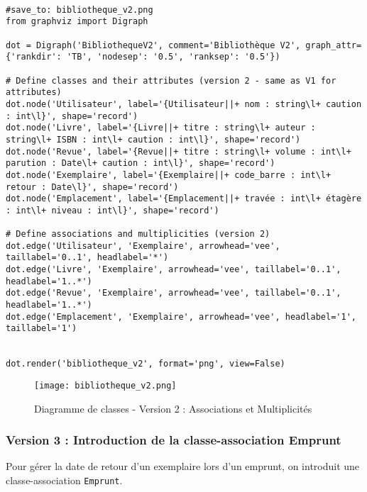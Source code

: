 \documentclass{article}
\begin{document}
\begin{verbatim}

#save_to: bibliotheque_v2.png
from graphviz import Digraph

dot = Digraph('BibliothequeV2', comment='Bibliothèque V2', graph_attr={'rankdir': 'TB', 'nodesep': '0.5', 'ranksep': '0.5'})

# Define classes and their attributes (version 2 - same as V1 for attributes)
dot.node('Utilisateur', label='{Utilisateur||+ nom : string\l+ caution : int\l}', shape='record')
dot.node('Livre', label='{Livre||+ titre : string\l+ auteur : string\l+ ISBN : int\l+ caution : int\l}', shape='record')
dot.node('Revue', label='{Revue||+ titre : string\l+ volume : int\l+ parution : Date\l+ caution : int\l}', shape='record')
dot.node('Exemplaire', label='{Exemplaire||+ code_barre : int\l+ retour : Date\l}', shape='record')
dot.node('Emplacement', label='{Emplacement||+ travée : int\l+ étagère : int\l+ niveau : int\l}', shape='record')

# Define associations and multiplicities (version 2)
dot.edge('Utilisateur', 'Exemplaire', arrowhead='vee', taillabel='0..1', headlabel='*')
dot.edge('Livre', 'Exemplaire', arrowhead='vee', taillabel='0..1', headlabel='1..*')
dot.edge('Revue', 'Exemplaire', arrowhead='vee', taillabel='0..1', headlabel='1..*')
dot.edge('Emplacement', 'Exemplaire', arrowhead='vee', headlabel='1', taillabel='1')


dot.render('bibliotheque_v2', format='png', view=False)
\end{verbatim}

\begin{figure}[H]
    \centering
    \texttt{[image: bibliotheque\_v2.png]}
    \caption{Diagramme de classes - Version 2 : Associations et Multiplicités}
    \label{fig:bibliotheque_v2}
\end{figure}

\subsubsection{Version 3 : Introduction de la classe-association Emprunt}

Pour gérer la date de retour d'un exemplaire lors d'un emprunt, on introduit une classe-association \texttt{Emprunt}.
\end{document}
